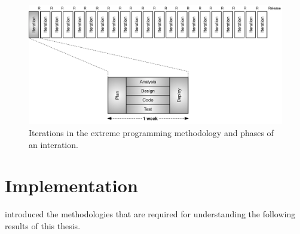 \documentclass[%
    a4paper,    %
    justified,  %
    nobib,      %
    openany     %
]{tufte-book}
\begin{document}
\begin{figure}[ht]
  \includegraphics[width=0.95\linewidth]{images/xp}
  \caption{Iterations in the extreme programming methodology and phases of an
    interation.~\cite[p. 18]{shore-aad-2007}}
  \label{fig:xp}
\end{figure}


\chapter{Implementation}
\label{chap:implementation}


 introduced the methodologies that are required
for understanding the following results of this thesis.
\end{document}
